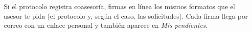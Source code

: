 \documentclass[11pt,a4paper]{article}
\begin{document}
{\small\tableofcontents}
\newpage
\begin{quevasahacer}
Si el protocolo registra coasesoría, firmas en línea los mismos formatos que el asesor te pida (el protocolo y, según el caso, las solicitudes). Cada firma llega por correo con un enlace personal y también aparece en \emph{Mis pendientes}.
\end{quevasahacer}



\end{document}
